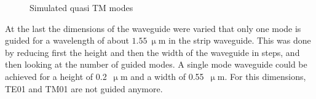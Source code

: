 \begin{figure}
\caption{Simulated quasi TM modes}%
\label{fig:3TM}%
\end{figure}

\newpage
At the last the dimensions of the waveguide were varied that only one mode is guided for a wavelength of about $1.55~\upmu$m in the strip waveguide. This was done by reducing first the height and then the width of the waveguide in steps, and then looking at the number of guided modes. A single mode waveguide could be achieved for a height of 0.2~$\upmu$m and a width of 0.55~$\upmu$m. For this dimensions, TE01 and TM01 are not guided anymore. 
